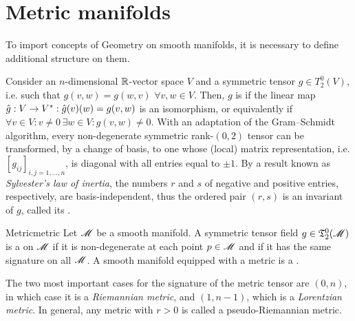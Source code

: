 
\section{Metric manifolds}

To import concepts of Geometry on smooth manifolds, it is necessary to define additional structure on them.

Consider an $ n $-dimensional $ \mathbb{R} $-vector space $ V $ and a symmetric tensor $ g \in T^0_2(V) $, i.e. such that $ g(v,w) = g(w,v) \,\,\forall v,w \in V $. Then, $ g $ is  if the linear map $ \hat{g} : V \rightarrow V^* : \hat{g}(v)(w) = g(v,w) $ is an isomorphism, or equivalently if $ \forall v \in V : v \neq 0 \, \exists w \in V : g(v,w) \neq 0 $. With an adaptation of the Gram--Schmidt algorithm, every non-degenerate symmetric rank-$ (0,2) $ tensor can be transformed, by a change of basis, to one whose (local) matrix representation, i.e. $ [g_{ij}]_{i,j = 1 , \dots , n} $, is diagonal with all entries equal to $ \pm 1 $. By a result known as \emph{Sylvester's law of inertia}, the numbers $ r $ and $ s $ of negative and positive entries, respectively, are basis-independent, thus the ordered pair $ (r,s) $ is an invariant of $ g $, called its .

\begin{definition}{Metric}{metric}
  Let $ \mathscr{M} $ be a smooth manifold. A symmetric tensor field $ g \in \mathfrak{T}^{0}_{2}(\mathscr{M}) $ is a  on $ \mathscr{M} $ if it is non-degenerate at each point $ p \in \mathscr{M} $ and if it has the same signature on all $ \mathscr{M} $. A smooth manifold equipped with a metric is a .
\end{definition}

The two most important cases for the signature of the metric tensor are $ (0,n) $, in which case it is a \emph{Riemannian metric}, and $ (1,n-1) $, which is a \emph{Lorentzian metric}. In general, any metric with $ r > 0 $ is called a pseudo-Riemannian metric.

